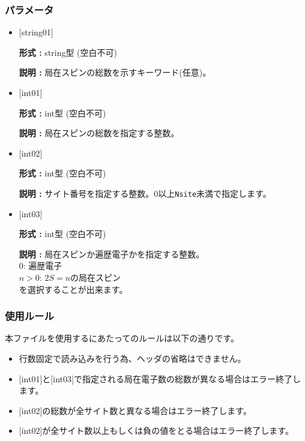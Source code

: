  \subsubsection{パラメータ}
 \begin{itemize}

 \item  $[$string01$]$

 {\bf 形式 :} string型 (空白不可)

{\bf 説明 :} 局在スピンの総数を示すキーワード(任意)。


  \item  $[$int01$]$

 {\bf 形式 :} int型 (空白不可)

{\bf 説明 :} 局在スピンの総数を指定する整数。

 
  \item  $[$int02$]$

 {\bf 形式 :} int型 (空白不可)

{\bf 説明 :} サイト番号を指定する整数。0以上\verb|Nsite|{未満}で指定します。

 
  \item  $[$int03$]$

 {\bf 形式 :} int型 (空白不可)

{\bf 説明 :} 局在スピンか遍歴電子かを指定する整数。\\
{
0: 遍歴電子\\
$n>0$: $2S=n$の局在スピン\\
}
を選択することが出来ます。
 \end{itemize}

\subsubsection{使用ルール}
本ファイルを使用するにあたってのルールは以下の通りです。
\begin{itemize}
\item 行数固定で読み込みを行う為、ヘッダの省略はできません。
\item $[$int01$]$と$[$int03$]$で指定される局在電子数の総数が異なる場合はエラー終了します。
\item $[$int02$]$の総数が全サイト数と異なる場合はエラー終了します。
\item $[$int02$]$が全サイト数以上もしくは負の値をとる場合はエラー終了します。
\end{itemize}


\newpage
